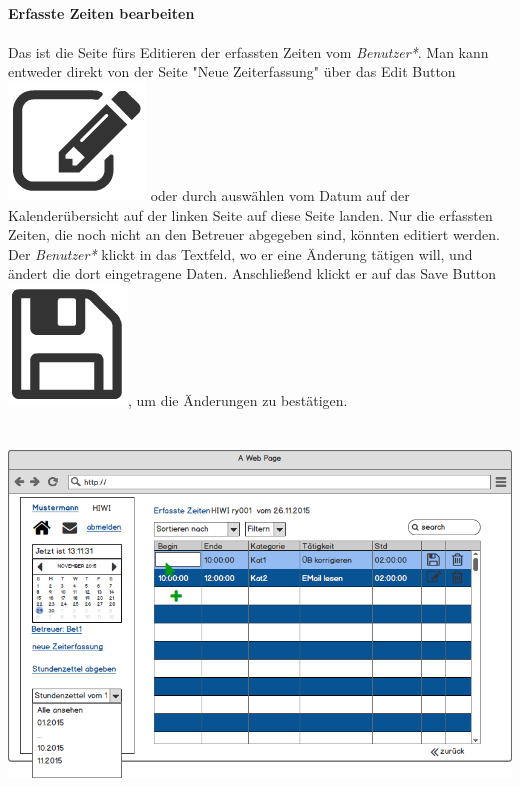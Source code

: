 \newpage
\textbf{\\Erfasste Zeiten bearbeiten}\\
\\
Das ist die Seite fürs Editieren der erfassten Zeiten vom \emph{Benutzer*}.
Man kann entweder direkt von der Seite "Neue Zeiterfassung" über das Edit Button \includegraphics[scale=.2]{UI/Button/Edit.png} oder durch auswählen vom Datum auf der Kalenderübersicht auf der linken Seite auf diese Seite landen. Nur die erfassten Zeiten, die noch nicht an den Betreuer abgegeben sind, könnten editiert werden.\\
Der \emph{Benutzer*} klickt in das Textfeld, wo er eine Änderung tätigen will, und ändert die dort eingetragene Daten. Anschließend klickt er auf das Save Button\includegraphics[scale=.2]{UI/Button/Save.png}, um die Änderungen zu bestätigen.\\
\\
\\
\includegraphics[width=\linewidth]{UI/Benutzer/Editieren.png}





